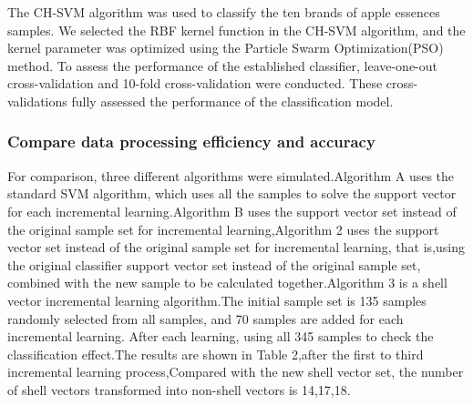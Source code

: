 \documentclass[a4paper]{article}
\begin{document}
The CH-SVM algorithm was used to classify the ten brands of apple essences samples. We selected the RBF kernel function in the CH-SVM algorithm, and the kernel parameter was optimized using the Particle Swarm Optimization(PSO) method. To assess the performance of the established classifier, leave-one-out cross-validation and 10-fold cross-validation were conducted. These cross-validations fully assessed the performance of the classification model.




    \subsubsection{Compare data processing efficiency and accuracy}


For comparison, three different algorithms were simulated.Algorithm A uses the standard SVM algorithm, which uses all the samples to solve the support vector for each incremental learning.Algorithm B uses the support vector set instead of the original sample set for incremental learning,Algorithm 2 uses the support vector set instead of the original sample set for incremental learning, that is,using the original classifier support vector set instead of the original sample set, combined with the new sample to be calculated together.Algorithm 3 is a shell vector incremental learning algorithm.The initial sample set is 135 samples randomly selected from all samples, and 70 samples are added for each incremental learning. After each learning, using all 345 samples to check the classification effect.The results are shown in Table 2,after the first to third incremental learning process,Compared with the new shell vector set, the number of shell vectors transformed into non-shell vectors is 14,17,18.
\end{document}

